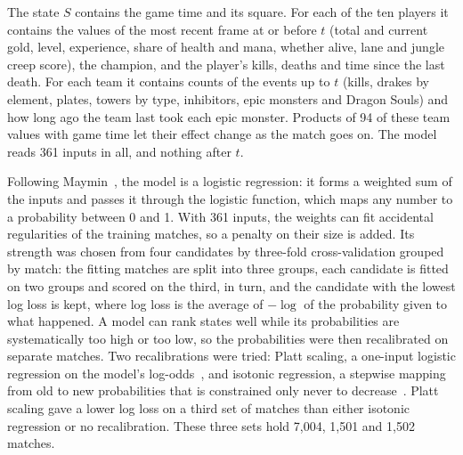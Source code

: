 The state $S$ contains the game time and its square. For each of the ten players it contains the values
of the most recent frame at or before $t$ (total and current gold, level, experience, share of health and
mana, whether alive, lane and jungle creep score), the champion, and the player's kills, deaths and time
since the last death. For each team it contains counts of the events up to $t$ (kills, drakes by element,
plates, towers by type, inhibitors, epic monsters and Dragon Souls) and how long ago the team last took
each epic monster. Products of 94 of these team values with game time let their effect change as the
match goes on. The model reads 361 inputs in all, and nothing after $t$.

Following Maymin~\cite{maymin2021smart}, the model is a logistic regression: it forms a weighted sum of
the inputs and passes it through the logistic function, which maps any number to a probability between 0
and 1. With 361 inputs, the weights can fit accidental regularities of the training matches, so a penalty
on their size is added. Its strength was chosen from four candidates by three-fold cross-validation
grouped by match: the fitting matches are split into three groups, each candidate is fitted on two groups
and scored on the third, in turn, and the candidate with the lowest log loss is kept, where log loss is
the average of $-\log$ of the probability given to what happened. A model can rank states well while its
probabilities are systematically too high or too low, so the probabilities were then recalibrated on
separate matches. Two recalibrations were tried: Platt scaling, a one-input logistic regression on the
model's log-odds~\cite{platt2000probabilities}, and isotonic regression, a stepwise mapping from old to
new probabilities that is constrained only never to decrease~\cite{zadrozny2002transforming}. Platt
scaling gave a lower log loss on a third set of matches than either isotonic regression or no
recalibration. These three sets hold 7,004, 1,501 and 1,502 matches.

